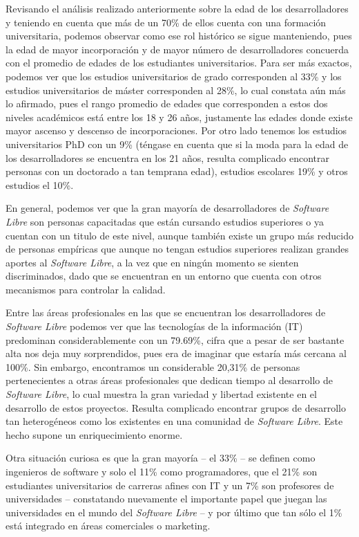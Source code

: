 Revisando el análisis realizado anteriormente sobre la edad de los desarrolladores y teniendo en cuenta que más de un 70\% de ellos cuenta con una formación universitaria, podemos observar como ese rol histórico se sigue manteniendo, pues la edad de mayor incorporación y de mayor número de desarrolladores concuerda con el promedio de edades de los estudiantes universitarios.  Para ser más exactos, podemos ver que los estudios universitarios de grado corresponden al 33\% y los estudios universitarios de máster corresponden al 28\%, lo cual constata aún más lo afirmado, pues el rango promedio de edades que corresponden a estos dos niveles académicos está entre los 18 y 26 años, justamente las edades donde existe mayor ascenso y descenso de incorporaciones. Por otro lado tenemos los estudios universitarios PhD con un 9\% (téngase en cuenta que si la moda para la edad de los desarrolladores se encuentra en los 21 años, resulta complicado encontrar personas con un doctorado a tan temprana edad), estudios escolares 19\% y otros estudios el 10\%.

En general, podemos ver que la gran mayoría de desarrolladores de \textit{Software Libre} son personas capacitadas que están cursando estudios superiores o ya cuentan con un titulo de este nivel, aunque también existe un grupo más reducido de personas empíricas que aunque no tengan estudios superiores realizan grandes aportes al \textit{Software Libre}, a la vez que en ningún momento se sienten discriminados, dado que se encuentran en un entorno que cuenta con otros mecanismos para controlar la calidad.

Entre las áreas profesionales en las que se encuentran los desarrolladores de \textit{Software Libre} podemos ver que las tecnologías de la información (IT) predominan considerablemente con un 79.69\%, cifra que a pesar de ser bastante alta nos deja muy sorprendidos, pues era de imaginar que estaría más cercana al 100\%.  Sin embargo,  encontramos un considerable 20,31\% de personas pertenecientes a otras áreas profesionales que dedican tiempo al desarrollo de \textit{Software Libre}, lo cual muestra la gran variedad y libertad existente en el desarrollo de estos proyectos.
Resulta complicado encontrar grupos de desarrollo tan heterogéneos como los existentes en una comunidad de \textit{Software Libre}. Este hecho supone un enriquecimiento enorme.

Otra situación curiosa es que la gran mayoría  – el 33\% –  se definen como ingenieros de software y solo el 11\% como programadores, que el 21\% son estudiantes universitarios de carreras afines con IT y un 7\% son profesores de universidades  –  constatando nuevamente el importante papel que juegan las universidades en el mundo del \textit{Software Libre} –  y por último que tan sólo el 1\% está integrado en áreas comerciales o marketing.
 
